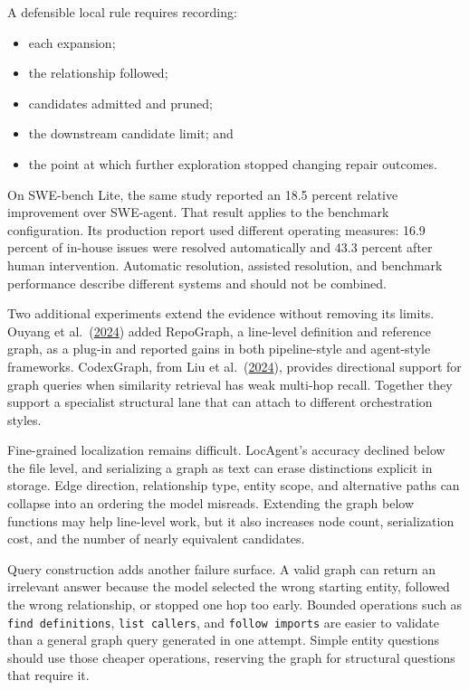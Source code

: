 
A defensible local rule requires recording:

\begin{itemize}
\tightlist
\item
  each expansion;
\item
  the relationship followed;
\item
  candidates admitted and pruned;
\item
  the downstream candidate limit; and
\item
  the point at which further exploration stopped changing repair outcomes.
\end{itemize}

On SWE-bench Lite, the same study reported an 18.5 percent relative improvement over SWE-agent. That result applies to the benchmark configuration. Its production report used different operating measures: 16.9 percent of in-house issues were resolved automatically and 43.3 percent after human intervention. Automatic resolution, assisted resolution, and benchmark performance describe different systems and should not be combined.

Two additional experiments extend the evidence without removing its limits. Ouyang et al.~(\href{https://arxiv.org/abs/2410.14684}{2024}) added RepoGraph, a line-level definition and reference graph, as a plug-in and reported gains in both pipeline-style and agent-style frameworks. CodexGraph, from Liu et al.~(\href{https://arxiv.org/abs/2408.03910}{2024}), provides directional support for graph queries when similarity retrieval has weak multi-hop recall. Together they support a specialist structural lane that can attach to different orchestration styles.

Fine-grained localization remains difficult. LocAgent's accuracy declined below the file level, and serializing a graph as text can erase distinctions explicit in storage. Edge direction, relationship type, entity scope, and alternative paths can collapse into an ordering the model misreads. Extending the graph below functions may help line-level work, but it also increases node count, serialization cost, and the number of nearly equivalent candidates.

Query construction adds another failure surface. A valid graph can return an irrelevant answer because the model selected the wrong starting entity, followed the wrong relationship, or stopped one hop too early. Bounded operations such as \texttt{find\ definitions}, \texttt{list\ callers}, and \texttt{follow\ imports} are easier to validate than a general graph query generated in one attempt. Simple entity questions should use those cheaper operations, reserving the graph for structural questions that require it.

